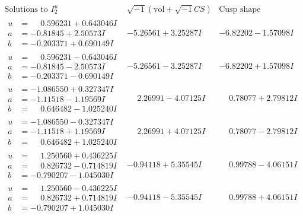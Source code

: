 \documentclass[1p]{elsarticle_modified}
\theoremstyle{definition}
\newcommand{\I}{\sqrt{-1}}
\begin{document}
$$\begin{array}{c|c|c}  
\text{Solutions to }I^u_{2}& \I (\text{vol} + \sqrt{-1}CS) & \text{Cusp shape}\\
 \hline 
\begin{aligned}
u &= \phantom{-}0.596231 + 0.643046 I \\
a &= -0.81845 + 2.50573 I \\
b &= -0.203371 + 0.690149 I\end{aligned}
 & -5.26561 + 3.25287 I & -6.82202 - 1.57098 I \\ \hline\begin{aligned}
u &= \phantom{-}0.596231 - 0.643046 I \\
a &= -0.81845 - 2.50573 I \\
b &= -0.203371 - 0.690149 I\end{aligned}
 & -5.26561 - 3.25287 I & -6.82202 + 1.57098 I \\ \hline\begin{aligned}
u &= -1.086550 + 0.327347 I \\
a &= -1.11518 - 1.19569 I \\
b &= \phantom{-}0.646482 - 1.025240 I\end{aligned}
 & \phantom{-}2.26991 - 4.07125 I & \phantom{-}0.78077 + 2.79812 I \\ \hline\begin{aligned}
u &= -1.086550 - 0.327347 I \\
a &= -1.11518 + 1.19569 I \\
b &= \phantom{-}0.646482 + 1.025240 I\end{aligned}
 & \phantom{-}2.26991 + 4.07125 I & \phantom{-}0.78077 - 2.79812 I \\ \hline\begin{aligned}
u &= \phantom{-}1.250560 + 0.436225 I \\
a &= \phantom{-}0.826732 - 0.714819 I \\
b &= -0.790207 - 1.045030 I\end{aligned}
 & -0.94118 + 5.35545 I & \phantom{-}0.99788 - 4.06151 I \\ \hline\begin{aligned}
u &= \phantom{-}1.250560 - 0.436225 I \\
a &= \phantom{-}0.826732 + 0.714819 I \\
b &= -0.790207 + 1.045030 I\end{aligned}
 & -0.94118 - 5.35545 I & \phantom{-}0.99788 + 4.06151 I \\ \hline\begin{aligned}

\end{aligned}
\end{array}$$
\end{document}
